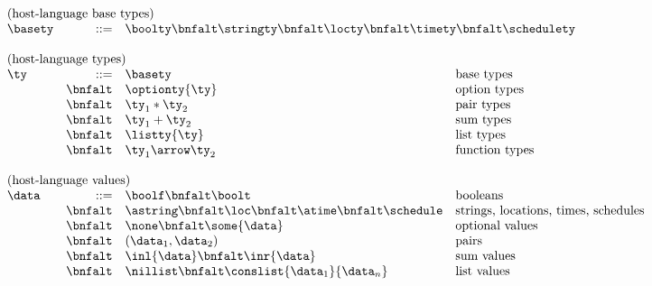 \begin{figure}[t]
\[
\begin{array}{lrll}
\multicolumn{4}{l}{\mbox{(host-language base types)}}\\ 
\basety & ::= & \multicolumn{2}{l}{\boolty \bnfalt \stringty \bnfalt \locty \bnfalt \timety \bnfalt \schedulety} \\
\\
\multicolumn{4}{l}{\mbox{(host-language types)}}\\ 
\ty & ::= & \basety & \mbox{base types} \\
 & \bnfalt & \optionty{\ty} & \mbox{option types}\\
 & \bnfalt & \ty_1 * \ty_2 & \mbox{pair types} \\
 & \bnfalt & \ty_1 + \ty_2 & \mbox{sum types} \\
 & \bnfalt & \listty{\ty} & \mbox{list types}\\
 & \bnfalt & \ty_1 \arrow \ty_2 & \mbox{function types} \\
\\
\multicolumn{4}{l}{\mbox{(host-language values)}}\\ 
\data & ::= & \boolf \bnfalt \boolt & \mbox{booleans} \\
 & \bnfalt & \astring \bnfalt \loc \bnfalt \atime \bnfalt \schedule &
 \mbox{strings, locations, times, schedules} \\
 & \bnfalt & \none \bnfalt 
                           \some{\data} & \mbox{optional values}\\
 & \bnfalt & (\data_1,\data_2) & \mbox{pairs} \\
 & \bnfalt & \inl{\data} \bnfalt 
                           \inr{\data} & \mbox{sum values} \\
 & \bnfalt & \nillist \bnfalt 
                           \conslist{\data_1}{\data_n} & \mbox{list values} \\


\end{array}\]
\end{figure}
